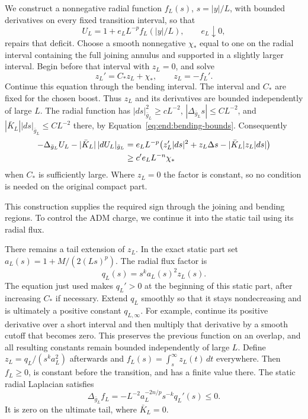 We construct a nonnegative radial function $f_L(s)$,
$s=|y|/L$, with bounded derivatives on every fixed transition
interval, so that
\begin{equation}\label{eq:end:repair-factor}
 U_L=1+e_LL^{-p}f_L(|y|/L),\qquad e_L\downarrow0,
\end{equation}
repairs that deficit.  Choose a smooth nonnegative $\chi_*$
equal to one on the radial interval containing the full joining
annulus and supported in a slightly larger interval.  Begin
before that interval with $z_L=0$, and solve
\[
 z_L'=C_*z_L+\chi_*,\qquad z_L=-f_L'.
\]
Continue this equation through the bending interval.  The
interval and $C_*$ are fixed for the chosen boost.  Thus $z_L$
and its derivatives are bounded independently of large $L$.
The radial function has $|ds|_{\bar g_L}^2\ge cL^{-2}$,
$|\Delta_{\bar g_L}s|\le CL^{-2}$, and
$|\bar K_L||ds|_{\bar g_L}\le CL^{-2}$ there, by
Equation~\eqref{eq:end:bending-bounds}.  Consequently
\begin{align}
 -\Delta_{\bar g_L}U_L-|\bar K_L|\,|dU_L|_{\bar g_L}
 &=e_LL^{-p}\bigl(z_L'|ds|^2+z_L\Delta s
                             -|\bar K_L|z_L|ds|\bigr)\notag\\
 &\ge c'e_LL^{-n}\chi_*                         \label{eq:end:repair-sign}
\end{align}
when $C_*$ is sufficiently large.  Where $z_L=0$ the factor
is constant, so no condition is needed on the original compact
part.

This construction supplies the required sign through the joining
and bending regions.  To control the ADM charge, we continue it into
the static tail using its radial flux.

There remains a tail extension of $z_L$.  In the exact static
part set $a_L(s)=1+M/(2(Ls)^p)$.  The radial flux factor is
\[
 q_L(s)=s^ka_L(s)^2z_L(s).
\]
The equation just used makes $q_L'>0$ at the beginning of this
static part, after increasing $C_*$ if necessary.  Extend
$q_L$ smoothly so that it stays nondecreasing and is ultimately
a positive constant $q_{L,\infty}$.  For example, continue its
positive derivative over a short interval and then multiply
that derivative by a smooth cutoff that becomes zero.  This
preserves the previous function on an overlap, and all resulting
constants remain bounded independently of large $L$.
Define $z_L=q_L/(s^ka_L^2)$ afterwards and
$f_L(s)=\int_s^\infty z_L(t)\,dt$ everywhere.  Then $f_L\ge0$,
is constant before the transition, and has a finite value there.
The static radial Laplacian satisfies
\[
 \Delta_{\bar g_L}f_L
 =-L^{-2}a_L^{-2n/p}s^{-k}q_L'(s)\le0.
\]
It is zero on the ultimate tail, where $\bar K_L=0$.

